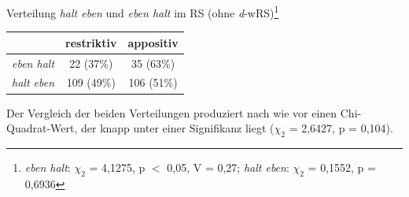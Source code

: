 \begin{exe}
	\ex\label{823} Verteilung \textit{halt eben} und \textit{eben halt} im RS (ohne \textit{d}-wRS)\footnote{\textit{eben halt}: $\chi_{2}$ = 4,1275, p $<$ 0,05, V = 0,27; \textit{halt eben}: $\chi_{2}$ = 0,1552, p = 0,6936}\\[-1em]
     \begin{tabular}[t]{|c|c|c|}
     \hline
	 {} & restriktiv & appositiv\\
	 \hline
	 \textit{eben halt} & 22 (37\%) & 35 (63\%)\\
	 \hline	 
	 \textit{halt eben} & 109 (49\%) & 106 (51\%)\\
	 \hline    
     \end{tabular}
\end{exe}                        
Der Vergleich der beiden Verteilungen produziert nach wie vor einen Chi-Quadrat-Wert, der knapp unter einer Signifikanz liegt ($\chi_{2}$ = 2,6427, p = 0,104).\\

